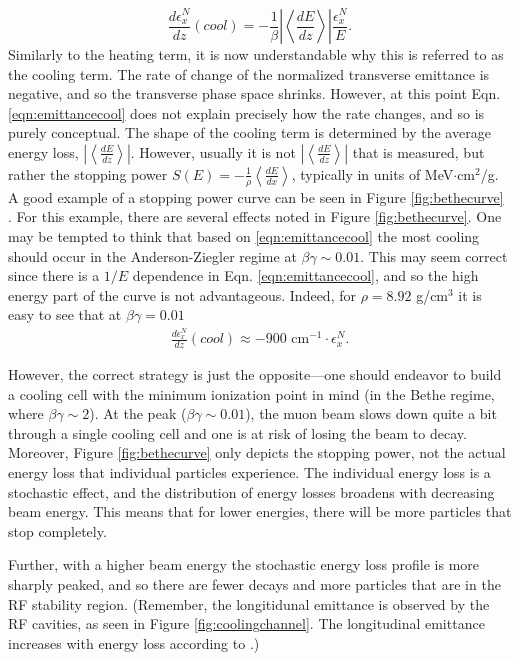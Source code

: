 \begin{equation}
\label{eqn:emittancecool}
\frac{d\epsilon_x^N}{dz}(cool)=-\frac{1}{\beta}\left| \left<\frac{dE}{dz}\right>\right| \frac{\epsilon_x^N}{E}.
\end{equation}
Similarly to the heating term, it is now understandable why this is referred to as the cooling term. The rate of change of the normalized transverse emittance is negative, and so the transverse phase space shrinks. However, at this point Eqn. \ref{eqn:emittancecool} does not explain precisely how the rate changes, and so is purely conceptual. The shape of the cooling term is determined by the average energy loss, $\left|\left<\frac{dE}{dz}\right>\right|$. However, usually it is not $\left|\left<\frac{dE}{dz}\right>\right|$ that is measured, but rather the stopping power $S(E)=-\frac{1}{\rho}\left<\frac{dE}{dx}\right>$, typically in units of MeV$\cdot$cm$^2$/g. A good example of a stopping power curve can be seen in Figure \ref{fig:bethecurve} \cite{PDG}. For this example, there are several effects noted in Figure \ref{fig:bethecurve}. One may be tempted to think that based on \ref{eqn:emittancecool} the most cooling should occur in the Anderson-Ziegler regime at $\beta\gamma\sim0.01$. This may seem correct since there is a $1/E$ dependence in Eqn. \ref{eqn:emittancecool}, and so the high energy part of the curve is not advantageous. Indeed, for $\rho= 8.92$ g/cm$^3$ it is easy to see that at $\beta\gamma=0.01$ 
\begin{align*}
\frac{d\epsilon_x^N}{dz}(cool)\approx-900 \text{ cm}^{-1} \cdot \epsilon_x^N.
\end{align*}

However, the correct strategy is just the opposite---one should endeavor to build a cooling cell with the minimum ionization point in mind (in the Bethe regime, where $\beta\gamma\sim2$). At the peak ($\beta\gamma\sim0.01$), the muon beam slows down quite a bit through a single cooling cell and one is at risk of losing the beam to decay. Moreover, Figure \ref{fig:bethecurve} only depicts the stopping power, not the actual energy loss that individual particles experience. The individual energy loss is a stochastic effect, and the distribution of energy losses broadens with decreasing beam energy. This means that for lower energies, there will be more particles that stop completely. 
\iffalse



Further, with a higher beam energy the stochastic energy loss profile is more sharply peaked, and so there are fewer decays and more particles that are in the RF stability region. (Remember, the longitidunal emittance is observed by the RF cavities, as seen in Figure \ref{fig:coolingchannel}. The longitudinal emittance increases with energy loss according to \cite{Fernow}.) 



